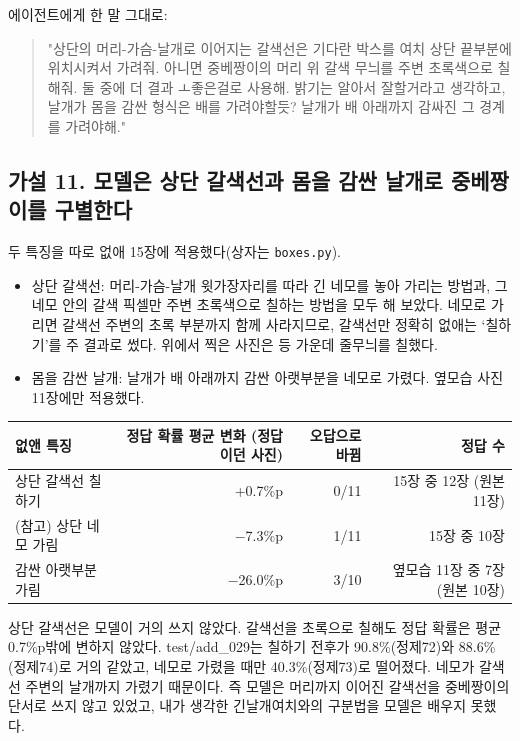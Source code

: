 \documentclass[11pt]{article}
\begin{document}
에이전트에게 한 말 그대로:
\begin{quote}
"상단의 머리-가슴-날개로 이어지는 갈색선은 기다란 박스를 여치 상단 끝부분에 위치시켜서 가려줘. 아니면 중베짱이의 머리 위 갈색 무늬를 주변 초록색으로 칠해줘. 둘 중에 더 결과 ㅗ좋은걸로 사용해. 밝기는 알아서 잘할거라고 생각하고, 날개가 몸을 감싼 형식은 배를 가려야할듯? 날개가 배 아래까지 감싸진 그 경계를 가려야해."
\end{quote}

\subsection*{가설 11. 모델은 상단 갈색선과 몸을 감싼 날개로 중베짱이를 구별한다}

두 특징을 따로 없애 15장에 적용했다(상자는 \texttt{boxes.py}).
\begin{itemize}
\item 상단 갈색선: 머리-가슴-날개 윗가장자리를 따라 긴 네모를 놓아 가리는 방법과, 그 네모 안의 갈색 픽셀만 주변 초록색으로 칠하는 방법을 모두 해 보았다. 네모로 가리면 갈색선 주변의 초록 부분까지 함께 사라지므로, 갈색선만 정확히 없애는 `칠하기'를 주 결과로 썼다. 위에서 찍은 사진은 등 가운데 줄무늬를 칠했다.
\item 몸을 감싼 날개: 날개가 배 아래까지 감싼 아랫부분을 네모로 가렸다. 옆모습 사진 11장에만 적용했다.
\end{itemize}

\begin{center}\footnotesize
\begin{tabular}{lrrr}
\toprule
없앤 특징 & 정답 확률 평균 변화 (정답이던 사진) & 오답으로 바뀜 & 정답 수 \\
\midrule
상단 갈색선 칠하기 & +0.7\%p & 0/11 & 15장 중 12장 (원본 11장) \\
(참고) 상단 네모 가림 & $-$7.3\%p & 1/11 & 15장 중 10장 \\
감싼 아랫부분 가림 & $-$26.0\%p & 3/10 & 옆모습 11장 중 7장 (원본 10장) \\
\bottomrule
\end{tabular}
\end{center}

상단 갈색선은 모델이 거의 쓰지 않았다. 갈색선을 초록으로 칠해도 정답 확률은 평균 0.7\%p밖에 변하지 않았다. test/add\_029는 칠하기 전후가 90.8\%(정제72)와 88.6\%(정제74)로 거의 같았고, 네모로 가렸을 때만 40.3\%(정제73)로 떨어졌다. 네모가 갈색선 주변의 날개까지 가렸기 때문이다. 즉 모델은 머리까지 이어진 갈색선을 중베짱이의 단서로 쓰지 않고 있었고, 내가 생각한 긴날개여치와의 구분법을 모델은 배우지 못했다.
\end{document}
